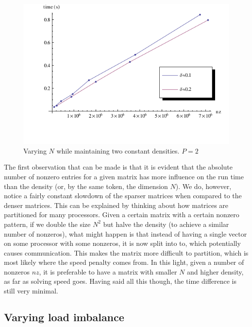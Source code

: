 \documentclass[a4paper]{article}
\begin{document}
\begin{figure}[h]
    \begin{center}
        \includegraphics[width=\plotsize]{img/density-run.pdf}
    \end{center}
    \caption{Varying $N$ while maintaining two constant densities. $P=2$}
    \label{fig:density-run}
\end{figure}

The first observation that can be made is that it is evident that the absolute number of
nonzero entries for a given matrix has more influence on the run time than the density
(or, by the same token, the dimension $N$). We do, however, notice a fairly constant
slowdown of the sparser matrices when compared to the denser matrices. This can be explained
by thinking about how matrices are partitioned for many processors. Given a certain matrix with
a certain nonzero pattern, if we double the size $N^2$ but halve the density (to achieve a similar
number of nonzeros), what might happen is that instead of having a single vector on some processor
with some nonzeros, it is now split into to, which potentially causes communication. This makes the
matrix more difficult to partition, which is most likely where the speed penalty comes from. In this
light, given a number of nonzeros $nz$, it is preferable to have a matrix with smaller $N$ and higher
density, as far as solving speed goes. Having said all this though, the time difference is
still very minimal.

\subsection{Varying load imbalance}\label{sec:imbalance-run}
\end{document}
